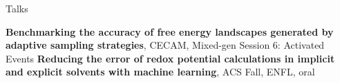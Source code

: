 \begin{rubric}{Talks}


\entry*[\hspace{1.05cm}2021] \textbf{Benchmarking the accuracy of free energy landscapes generated by adaptive sampling strategies}, CECAM, Mixed-gen Session 6: Activated Events
\entry*[\hspace{1.05cm}2021] \textbf{Reducing the error of redox potential calculations in implicit and explicit solvents with machine learning}, ACS Fall, ENFL, oral
\end{rubric}
